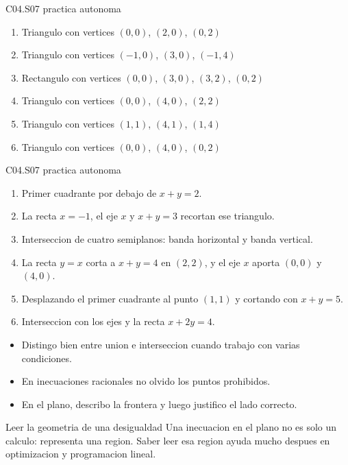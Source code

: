 \begin{shortanswer}{C04.S07 practica autonoma}
\begin{enumerate}[label=\textbf{PX-C04.S07-\arabic*:}, leftmargin=*]
  \item Triangulo con vertices \((0,0)\), \((2,0)\), \((0,2)\)
  \item Triangulo con vertices \((-1,0)\), \((3,0)\), \((-1,4)\)
  \item Rectangulo con vertices \((0,0)\), \((3,0)\), \((3,2)\), \((0,2)\)
  \item Triangulo con vertices \((0,0)\), \((4,0)\), \((2,2)\)
  \item Triangulo con vertices \((1,1)\), \((4,1)\), \((1,4)\)
  \item Triangulo con vertices \((0,0)\), \((4,0)\), \((0,2)\)
\end{enumerate}
\end{shortanswer}

\begin{fullsolution}{C04.S07 practica autonoma}
\begin{enumerate}[label=\textbf{PX-C04.S07-\arabic*:}, leftmargin=*]
  \item Primer cuadrante por debajo de \(x+y=2\).
  \item La recta \(x=-1\), el eje \(x\) y \(x+y=3\) recortan ese triangulo.
  \item Interseccion de cuatro semiplanos: banda horizontal y banda vertical.
  \item La recta \(y=x\) corta a \(x+y=4\) en \((2,2)\), y el eje \(x\) aporta \((0,0)\) y \((4,0)\).
  \item Desplazando el primer cuadrante al punto \((1,1)\) y cortando con \(x+y=5\).
  \item Interseccion con los ejes y la recta \(x+2y=4\).
\end{enumerate}
\end{fullsolution}

\begin{selfcheck}
\begin{itemize}
  \item Distingo bien entre union e interseccion cuando trabajo con varias condiciones.
  \item En inecuaciones racionales no olvido los puntos prohibidos.
  \item En el plano, describo la frontera y luego justifico el lado correcto.
\end{itemize}
\end{selfcheck}

\begin{extension}{Leer la geometria de una desigualdad}
Una inecuacion en el plano no es solo un calculo: representa una region. Saber leer esa region
ayuda mucho despues en optimizacion y programacion lineal.
\end{extension}
